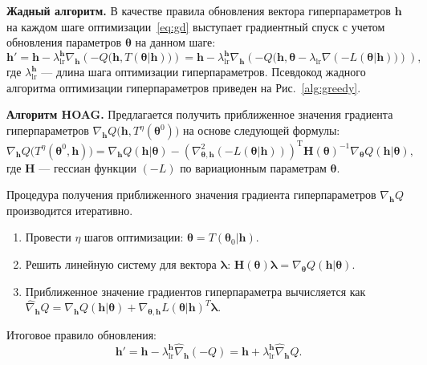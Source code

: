 \textbf{Жадный алгоритм. }
В качестве  правила обновления вектора гиперпараметров $\mathbf{h}$ на каждом шаге оптимизации~\eqref{eq:gd} выступает градиентный спуск с учетом обновления параметров $\boldsymbol{\theta}$ на данном шаге:
\begin{equation}
\label{eq:greed}
\mathbf{h}' =	 \mathbf{h} -  \lambda_{\text{lr}}^{\mathbf{h}} \nabla_{\mathbf{h}}  \left(-Q \bigl(\mathbf{h}, T(\boldsymbol{\theta}| \mathbf{h})\bigr)\right) = \mathbf{h} -  \lambda_{\text{lr}}^{\mathbf{h}} \nabla_{\mathbf{h}}  \left(-Q\bigl(\mathbf{h}, \boldsymbol{\theta} -  \lambda_{\text{lr}} \nabla \left(-L(\boldsymbol{\theta}| \mathbf{h}))\right)\right),
\end{equation}
где $ \lambda_{\text{lr}}^{\mathbf{h}}$ --- длина шага оптимизации гиперпараметров.
Псевдокод жадного алгоритма оптимизации гиперпараметров приведен на Рис.~\ref{alg:greedy}.

\textbf{Алгоритм HOAG. }
Предлагается получить приближенное значения градиента гиперпараметров $\nabla_{\mathbf{h}} Q \bigl(\mathbf{h}, T^\eta(\boldsymbol{\theta}^0)\bigr)$ на основе следующей формулы:
\[
\nabla_{\mathbf{h}} Q \bigl(T^\eta(\boldsymbol{\theta}^0, \mathbf{h})\bigr) = \nabla_{\mathbf{h}} Q( \mathbf{h}| \boldsymbol{\theta}) - \left(\nabla^2_{\boldsymbol{\theta}, \mathbf{h}} (-L(\boldsymbol{\theta}| \mathbf{h}))\right)^\text{T}\mathbf{H}(\boldsymbol{\theta})^{-1}\nabla_{\boldsymbol{\theta}} Q( \mathbf{h}| \boldsymbol{\theta}),
\]
где $\mathbf{H}$ --- гессиан функции $(-L)$ по вариационным параметрам $\boldsymbol{\theta}$.

Процедура получения приближенного значения градиента гиперпараметров $\nabla_{\mathbf{h}} Q$  производится итеративно.
\begin{enumerate}
\item Провести $\eta$ шагов оптимизации: $\boldsymbol{\theta} = T(\boldsymbol{\theta}_0| \mathbf{h})$.
\item Решить линейную систему для вектора $\boldsymbol{\lambda}$: $\mathbf{H}(\boldsymbol{\theta})\boldsymbol{\lambda} =  \nabla_{\boldsymbol{\theta}} Q(\mathbf{h}|\boldsymbol{\theta})$.
\item Приближенное значение градиентов гиперпараметра вычисляется как $\hat{\nabla}_{\mathbf{h}}Q = \nabla_{\mathbf{h}}Q(\mathbf{h}|\boldsymbol{\theta}) +\nabla_{\boldsymbol{\theta}, \mathbf{h}} L(\boldsymbol{\theta}| \mathbf{h})^T\boldsymbol{\lambda}$.
\end{enumerate}

Итоговое правило обновления:
\begin{equation}
\label{eq:update_hyper}
\mathbf{h}' = \mathbf{h} - \lambda_{\text{lr}}^{\mathbf{h}} \hat{\nabla}_{\mathbf{h}} (-Q) = \mathbf{h} +  \lambda_{\text{lr}}^{\mathbf{h}} \hat{\nabla}_{\mathbf{h}}Q.
\end{equation}


